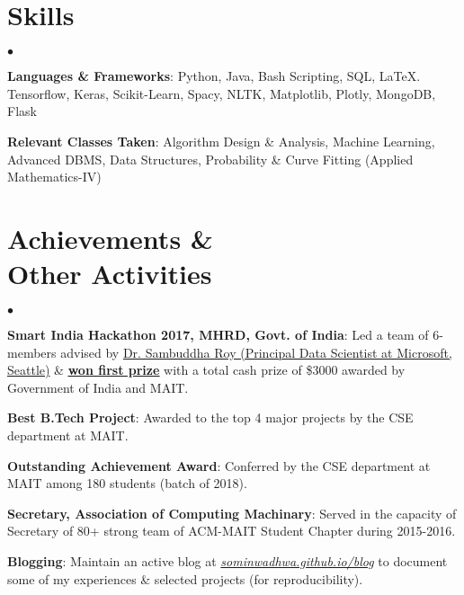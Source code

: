 \documentclass[margin,line]{res}
\newenvironment{list2}{
  \begin{list}{$\bullet$}{%
      \setlength{\itemsep}{0in}
      \setlength{\parsep}{0in} \setlength{\parskip}{0in}
      \setlength{\topsep}{0in} \setlength{\partopsep}{0in}
      \setlength{\leftmargin}{0.2in}}}{\end{list}}
\begin{document}
\begin{resume}
\section{\sc Skills}
\begin{list2}
\item {\bf Languages \& Frameworks}: Python, Java, Bash Scripting, SQL, \LaTeX. Tensorflow, Keras, Scikit-Learn, Spacy, NLTK, Matplotlib, Plotly, MongoDB, Flask 
\item {\bf Relevant Classes Taken}: Algorithm Design \& Analysis, Machine Learning, Advanced DBMS, Data Structures, Probability \& Curve Fitting (Applied Mathematics-IV)
\end{list2}

\section{\sc Achievements \& \\ Other Activities}
\begin{list2}
\item {\bf Smart India Hackathon 2017, MHRD, Govt. of India}: Led a team of 6-members advised by {\href{https://www.linkedin.com/in/sambuddharoy/}{Dr. Sambuddha Roy (Principal Data Scientist at Microsoft, Seattle)}} \& {\href{https://www.linkedin.com/feed/update/urn:li:activity:6255398180318470144}{\bf {\underline{won first prize}}}} with a total cash prize of \$3000 awarded by Government of India and MAIT.
\item {\bf Best B.Tech Project}: Awarded to the top 4 major projects by the CSE department at MAIT.
\item {\bf Outstanding Achievement Award}: Conferred by the CSE department at MAIT among 180 students (batch of 2018).
\item {\bf Secretary, Association of Computing Machinary}: Served in the capacity of Secretary of 80+ strong team of ACM-MAIT Student Chapter during 2015-2016.
\item {\bf Blogging}: Maintain an active blog at \textit{{\href{https://sominwadhwa.github.io/blog/}{sominwadhwa.github.io/blog}}} to document some of my experiences \& selected projects (for reproducibility).
\end{list2}

\end{resume}
\end{document}
